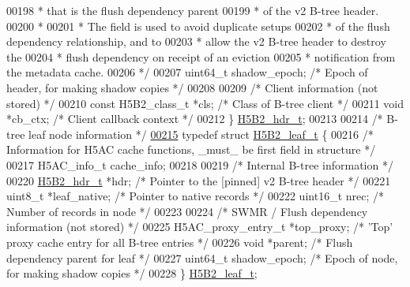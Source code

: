 \begin{DoxyCode}
{{00198 \textcolor{comment}{                                 * that is the flush dependency parent}
00199 \textcolor{comment}{                                 * of the v2 B-tree header.}
00200 \textcolor{comment}{                 *}
00201 \textcolor{comment}{                 * The field is used to avoid duplicate setups}
00202 \textcolor{comment}{                                 * of the flush dependency relationship, and to}
00203 \textcolor{comment}{                                 * allow the v2 B-tree header to destroy the}
00204 \textcolor{comment}{                                 * flush dependency on receipt of an eviction}
00205 \textcolor{comment}{                                 * notification from the metadata cache.}
00206 \textcolor{comment}{                 */}
00207     uint64\_t    shadow\_epoch;   \textcolor{comment}{/* Epoch of header, for making shadow copies */}
00208 
00209     \textcolor{comment}{/* Client information (not stored) */}
00210     \textcolor{keyword}{const} H5B2\_class\_t *cls;    \textcolor{comment}{/* Class of B-tree client */}
00211     \textcolor{keywordtype}{void}        *cb\_ctx;        \textcolor{comment}{/* Client callback context */}
00212 \} \hyperlink{struct_h5_b2__hdr__t}{H5B2\_hdr\_t};
00213 
00214 \textcolor{comment}{/* B-tree leaf node information */}
\hyperlink{struct_h5_b2__leaf__t}{00215} \textcolor{keyword}{typedef} \textcolor{keyword}{struct }\hyperlink{struct_h5_b2__leaf__t}{H5B2\_leaf\_t} \{
00216     \textcolor{comment}{/* Information for H5AC cache functions, \_must\_ be first field in structure */}
00217     H5AC\_info\_t cache\_info;
00218 
00219     \textcolor{comment}{/* Internal B-tree information */}
00220     \hyperlink{struct_h5_b2__hdr__t}{H5B2\_hdr\_t}    *hdr;       \textcolor{comment}{/* Pointer to the [pinned] v2 B-tree header   */}
00221     uint8\_t     *leaf\_native;   \textcolor{comment}{/* Pointer to native records                  */}
00222     uint16\_t    nrec;           \textcolor{comment}{/* Number of records in node                  */}
00223 
00224     \textcolor{comment}{/* SWMR / Flush dependency information (not stored) */}
00225     H5AC\_proxy\_entry\_t *top\_proxy;  \textcolor{comment}{/* 'Top' proxy cache entry for all B-tree entries */}
00226     \textcolor{keywordtype}{void}        *parent;        \textcolor{comment}{/* Flush dependency parent for leaf           */}
00227     uint64\_t    shadow\_epoch;   \textcolor{comment}{/* Epoch of node, for making shadow copies */}
00228 \} \hyperlink{struct_h5_b2__leaf__t}{H5B2\_leaf\_t};
}}
\end{DoxyCode}
